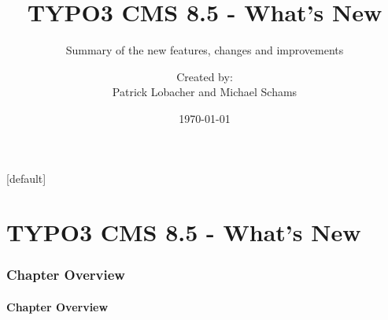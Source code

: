 \documentclass[t]{beamer}
\title{TYPO3 CMS 8.5 - What's New}
\subtitle{Summary of the new features, changes and improvements}
\author{
	\centerline{Created by:}
	\centerline{Patrick Lobacher and Michael Schams}
}
\date{\today}
\begin{document}
\sharefont


\begingroup
	[default]
	\begin{frame}
		\titlepage
	\end{frame}
\endgroup


\section*{TYPO3 CMS 8.5 - What's New}
\begin{frame}[fragile]
	\frametitle{Chapter Overview}
	\framesubtitle{Chapter Overview}

	\tableofcontents

\end{frame}










\end{document}
